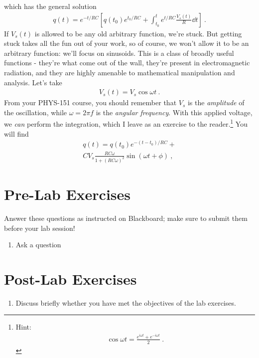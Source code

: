 \documentclass[12pt]{article}
\begin{document}
which has the general solution
\begin{gather*}
  q(t) = e^{-t/RC} \left[ 
    q(t_0) e^{t_0/RC} + \int_{t_0}^t e^{t/RC} \frac{V_s(t)}{R} \dd t
\right]\ .
\end{gather*}
If $V_s(t)$ is allowed to be any old arbitrary function, we're stuck.
But getting stuck takes all the fun out of your work, so of course, we
won't allow it to be an arbitrary function: we'll focus on sinusoids.
This is a class of broadly useful functions - they're what come out of
the wall, they're present in electromagnetic radiation, and they are
highly amenable to mathematical manipulation and analysis.  Let's take 
\begin{gather*}
  V_s(t) = V_s \cos \omega t\ .
\end{gather*}
From your PHYS-151 course, you should remember that $V_s$ is the
\textit{amplitude} of the oscillation, while $\omega = 2 \pi f$ is the
\textit{angular frequency}.  With this applied voltage, we
\textit{can} perform the integration, which I leave as an exercise to
the reader.\footnote{Hint:
  \begin{gather*}
    \cos \omega t = \frac{e^{i\omega t} + e^{-i\omega t}}{2}\ .
  \end{gather*}
}
You will find
\begin{multline*}
  q(t) = q(t_0) e^{-(t-t_0)/RC} + \\
  C V_s \frac{RC\omega}{1+(RC\omega)^2} \sin (\omega t + \phi )\ ,
\end{multline*}

\newpage

\section*{Pre-Lab Exercises}

Answer these questions as instructed on Blackboard; make sure to
submit them before your lab session!

\begin{enumerate}
\item Ask a question
\end{enumerate}

\newpage

\section*{Post-Lab Exercises}

\begin{enumerate}
\item Discuss briefly whether you have met the objectives of the lab
  exercises.
\end{enumerate}
\end{document}
